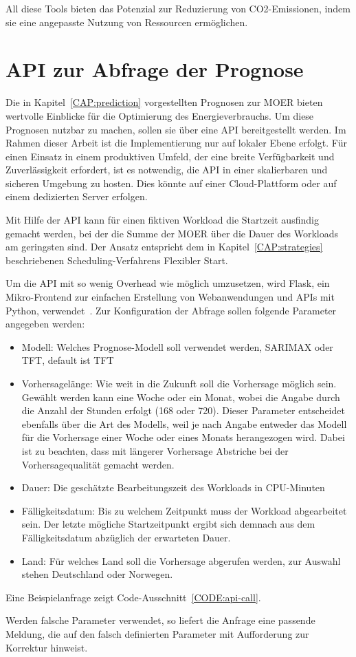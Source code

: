 All diese Tools bieten das Potenzial zur Reduzierung von CO2-Emissionen, indem sie eine angepasste Nutzung von Ressourcen ermöglichen.

\section{API zur Abfrage der Prognose}
Die in Kapitel~\ref{CAP:prediction} vorgestellten Prognosen zur \ac{MOER} bieten wertvolle Einblicke für die Optimierung des Energieverbrauchs.
Um diese Prognosen nutzbar zu machen, sollen sie über eine \ac{API} bereitgestellt werden.
Im Rahmen dieser Arbeit ist die Implementierung nur auf lokaler Ebene erfolgt.
Für einen Einsatz in einem produktiven Umfeld, der eine breite Verfügbarkeit und Zuverlässigkeit erfordert, ist es notwendig, die \ac{API} in einer skalierbaren und sicheren Umgebung zu hosten.
Dies könnte auf einer Cloud-Plattform oder auf einem dedizierten Server erfolgen.

Mit Hilfe der \ac{API} kann für einen fiktiven Workload die Startzeit ausfindig gemacht werden, bei der die Summe der \ac{MOER} über die Dauer des Workloads am geringsten sind.
Der Ansatz entspricht dem in Kapitel~\ref{CAP:strategies} beschriebenen Scheduling-Verfahrens \glqq Flexibler Start\grqq{}.

Um die \ac{API} mit so wenig Overhead wie möglich umzusetzen, wird Flask, ein Mikro-Frontend zur einfachen Erstellung von Webanwendungen und \acp{API} mit Python, verwendet~\cite{Flask.02032024}.
Zur Konfiguration der Abfrage sollen folgende Parameter angegeben werden:
\begin{itemize}
 \item Modell: Welches Prognose-Modell soll verwendet werden, \ac{SARIMAX} oder \ac{TFT}, default ist \ac{TFT}
 \item Vorhersagelänge: Wie weit in die Zukunft soll die Vorhersage möglich sein.
 Gewählt werden kann eine Woche oder ein Monat, wobei die Angabe durch die Anzahl der Stunden erfolgt (168 oder 720).
 Dieser Parameter entscheidet ebenfalls über die Art des Modells, weil je nach Angabe entweder das Modell für die Vorhersage einer Woche oder eines Monats herangezogen wird.
 Dabei ist zu beachten, dass mit längerer Vorhersage Abstriche bei der Vorhersagequalität gemacht werden.
 \item Dauer: Die geschätzte Bearbeitungszeit des Workloads in \ac{CPU}-Minuten
 \item Fälligkeitsdatum: Bis zu welchem Zeitpunkt muss der Workload abgearbeitet sein.
 Der letzte mögliche Startzeitpunkt ergibt sich demnach aus dem Fälligkeitsdatum abzüglich der erwarteten Dauer.
 \item Land: Für welches Land soll die Vorhersage abgerufen werden, zur Auswahl stehen Deutschland oder Norwegen.
\end{itemize}
Eine Beispielanfrage zeigt Code-Ausschnitt~\ref{CODE:api-call}.

Werden falsche Parameter verwendet, so liefert die Anfrage eine passende Meldung, die auf den falsch definierten Parameter mit Aufforderung zur Korrektur hinweist.

